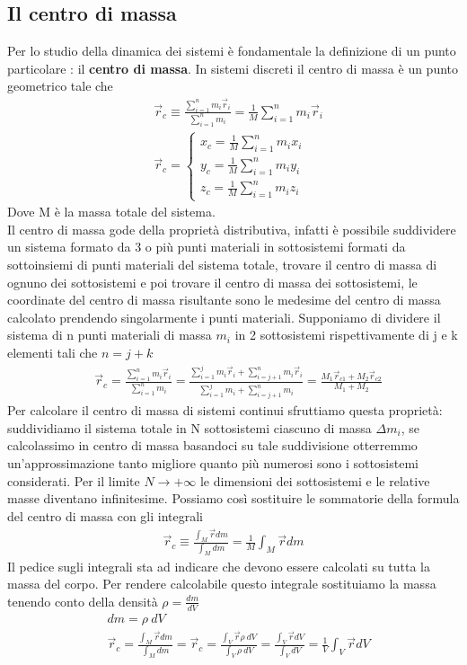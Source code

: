 \subsection{Il centro di massa}
Per lo studio della dinamica dei sistemi è fondamentale la definizione di un punto particolare : il \textbf{centro di massa}.
In sistemi discreti il centro di massa è un punto geometrico tale che
\begin{align*}
&\vec{r}_c \equiv \frac{\sum_{i = 1}^{n}m_i \vec{r}_i}{\sum_{i = 1}^{n}m_i} = \frac{1}{M} \sum_{i=1}^{n}m_i \vec{r}_i\\
&\vec{r}_c = 
\begin{cases}
	x_c = \frac{1}{M} \sum_{i=1}^{n}m_i x_i\\
	y_c = \frac{1}{M} \sum_{i=1}^{n}m_i y_i\\
	z_c = \frac{1}{M} \sum_{i=1}^{n}m_i z_i
\end{cases}
\end{align*}
Dove M è la massa totale del sistema.\\
Il centro di massa gode della proprietà distributiva, infatti è possibile suddividere un sistema formato da 3 o più punti materiali in sottosistemi formati da sottoinsiemi di punti materiali del sistema totale, trovare il centro di massa di ognuno dei sottosistemi e poi trovare il centro di massa dei sottosistemi, le coordinate del centro di massa risultante sono le medesime del centro di massa calcolato prendendo singolarmente i punti materiali. Supponiamo di dividere il sistema di n punti materiali di massa $m_i$ in 2 sottosistemi rispettivamente di j e k elementi tali che $n = j+k$
\begin{align}\label{eq:motocentrodimassa}
	&\vec{r}_c = \frac{\sum_{i = 1}^{n}m_i \vec{r}_i}{\sum_{i = 1}^{n}m_i} = \frac{\sum_{i = 1}^{j}m_i \vec{r}_i+\sum_{i = j+1}^{n}m_i\vec{r}_i}{\sum_{i = 1}^{j}m_i+\sum_{i = j+1}^{n}m_i} =\frac{M_1 \vec{r}_{c1}+M_2 \vec{r}_{c2}}{M_1+M_2}
\end{align}
Per calcolare il centro di massa di sistemi continui sfruttiamo questa proprietà: suddividiamo il sistema totale in N sottosistemi ciascuno di massa $\Delta m_i$, se calcolassimo in centro di massa basandoci su tale suddivisione otterremmo un'approssimazione tanto migliore quanto più numerosi sono i sottosistemi considerati. Per il limite $N\rightarrow +\infty $ le dimensioni dei sottosistemi e le relative masse diventano infinitesime. Possiamo così sostituire le sommatorie della formula del centro di massa con gli integrali
\begin{align*}
	\vec{r}_{c} \equiv \frac{\int_M \vec{r}dm}{\int_M dm}= \frac{1}{M}\int_M\vec{r}dm
\end{align*}
Il pedice sugli integrali sta ad indicare che devono essere calcolati su tutta la massa del corpo. Per rendere calcolabile questo integrale sostituiamo la massa tenendo conto della densità $\rho = \frac{dm}{dV}$
\begin{align*}
&dm = \rho\ dV\\
&\vec{r}_{c} = \frac{\int_M \vec{r}dm}{\int_M dm}=\vec{r}_{c} = \frac{\int_V \vec{r}\rho\ dV}{\int_V \rho\ dV}=\frac{\int_V \vec{r} dV}{\int_V dV}= \frac{1}{V}\int_V \vec{r} dV
\end{align*}
